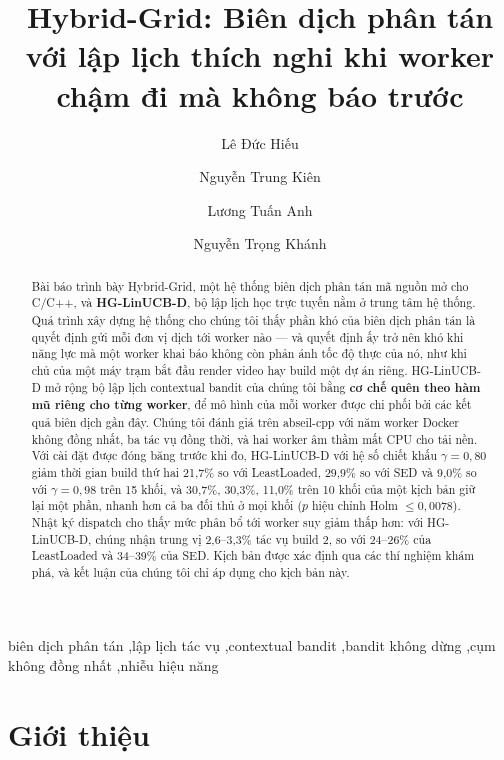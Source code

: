 \documentclass[final,5p,times,twocolumn]{elsarticle}
\begin{document}
\begin{frontmatter}

\title{Hybrid-Grid: Biên dịch phân tán với lập lịch thích nghi khi worker chậm đi mà không báo trước}

\author[a]{Lê Đức Hiếu}
\author[a]{Nguyễn Trung Kiên}
\author[a]{Lương Tuấn Anh}
\author[a]{Nguyễn Trọng Khánh}

\begin{abstract}
Bài báo trình bày Hybrid-Grid, một hệ thống biên dịch phân tán mã nguồn mở cho C/C++, và \textbf{HG-LinUCB-D}, bộ lập lịch học trực tuyến nằm ở trung tâm hệ thống. Quá trình xây dựng hệ thống cho chúng tôi thấy phần khó của biên dịch phân tán là quyết định gửi mỗi đơn vị dịch tới worker nào --- và quyết định ấy trở nên khó khi năng lực mà một worker khai báo không còn phản ánh tốc độ thực của nó, như khi chủ của một máy trạm bắt đầu render video hay build một dự án riêng. HG-LinUCB-D mở rộng bộ lập lịch contextual bandit của chúng tôi bằng \textbf{cơ chế quên theo hàm mũ riêng cho từng worker}, để mô hình của mỗi worker được chi phối bởi các kết quả biên dịch gần đây. Chúng tôi đánh giá trên abseil-cpp với năm worker Docker không đồng nhất, ba tác vụ đồng thời, và hai worker âm thầm mất CPU cho tải nền. Với cài đặt được đóng băng trước khi đo, HG-LinUCB-D với hệ số chiết khấu $\gamma=0{,}80$ giảm thời gian build thứ hai 21,7\% so với LeastLoaded, 29,9\% so với SED và 9,0\% so với $\gamma=0{,}98$ trên 15 khối, và 30,7\%, 30,3\%, 11,0\% trên 10 khối của một kịch bản giữ lại một phần, nhanh hơn cả ba đối thủ ở mọi khối ($p$ hiệu chỉnh Holm $\le0{,}0078$). Nhật ký dispatch cho thấy mức phân bổ tới worker suy giảm thấp hơn: với HG-LinUCB-D, chúng nhận trung vị 2,6--3,3\% tác vụ build 2, so với 24--26\% của LeastLoaded và 34--39\% của SED. Kịch bản được xác định qua các thí nghiệm khám phá, và kết luận của chúng tôi chỉ áp dụng cho kịch bản này.
\end{abstract}

\begin{keyword}
biên dịch phân tán \sep lập lịch tác vụ \sep contextual bandit \sep bandit không dừng \sep cụm không đồng nhất \sep nhiễu hiệu năng
\end{keyword}

\end{frontmatter}

\section{Giới thiệu}
\label{sec:intro}
\end{document}
